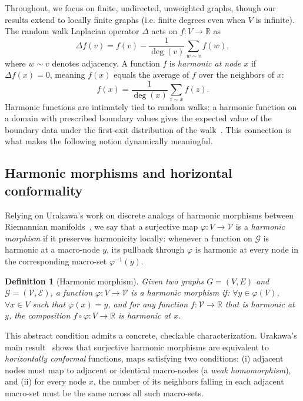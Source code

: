 \documentclass[twocolumn,superscriptaddress,tightenlines,aps,prx,floatfix]{revtex4-2}
\newtheorem{definition}{Definition}
\begin{document}
\begin{bibunit}
Throughout, we focus on finite, undirected, unweighted graphs, though our results extend to locally finite graphs (i.e. finite degrees even when $V$ is infinite). The random walk Laplacian operator $\Delta$ acts on $f: V \rightarrow \mathbb{R}$ as
\begin{equation}
\Delta f(v) = f(v) - \frac{1}{\deg(v)} \sum_{w \sim v} f(w),
\end{equation}
where $w \sim v$ denotes adjacency. A function $f$ is \emph{harmonic at node $x$ }if $\Delta f(x) = 0$, meaning $f(x)$ equals the average of $f$ over the neighbors of $x$:
\begin{equation}
f(x) = \frac{1}{\deg(x)}\sum_{z \sim x}f(z).
\end{equation}
Harmonic functions are intimately tied to random walks: a harmonic function on a domain with prescribed boundary values gives the expected value of the boundary data under the first-exit distribution of the walk~\cite{Lawler1991,barahudcovaLatticeModels}. 
This connection is what makes the following notion dynamically meaningful.



\subsection{Harmonic morphisms and horizontal conformality}
Relying on Urakawa's work on discrete analogs of harmonic morphisms between Riemannian manifolds~\cite{Urakawa_Harmonic_morphisms_2000,Fuglede1978HarmonicMB,Ishihara1979AMO}, we say that a surjective map $\varphi: V \rightarrow \mathcal{V}$ is a \emph{harmonic morphism} if it preserves harmonicity locally: whenever a function on $\mathcal{G}$ is harmonic at a macro-node $y$, its pullback through $\varphi$ is harmonic at every node in the corresponding macro-set $\varphi^{-1}(y)$.

\begin{definition}[Harmonic morphism]
\label{def:harmonic_morphism}
Given two graphs $G=(V,E)$ and $\mathcal{G}=(\mathcal{V},\mathcal{E})$, a function $\varphi: V \rightarrow \mathcal{V}$ is a \emph{harmonic morphism} if: $\forall y \in \varphi(V)$, $\forall x \in V$ such that $\varphi(x)=y$, and for any function $f:\mathcal{V} \rightarrow \mathbb{R}$ that is harmonic at $y$, the composition $f \circ \varphi : V \rightarrow \mathbb{R}$ is harmonic at $x$.
\end{definition} 

This abstract condition admits a concrete, checkable characterization. Urakawa's main result~\cite{Urakawa_Harmonic_morphisms_2000} shows that surjective harmonic morphisms are equivalent to \emph{horizontally conformal} functions, maps satisfying two conditions: (i) adjacent nodes must map to adjacent or identical macro-nodes (a \emph{weak homomorphism}), and (ii) for every node $x$, the number of its neighbors falling in each adjacent macro-set must be the same across all such macro-sets.


\end{bibunit}
\end{document}
